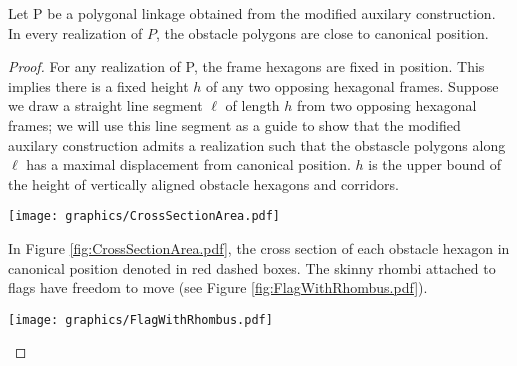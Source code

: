 \begin{lem}\label{lem:aux-C}
Let P be a polygonal linkage obtained from the modified auxilary construction.  
In every realization of $P$, the obstacle polygons are close to canonical position.
\end{lem}

\begin{proof}


For any realization of P, the frame hexagons are fixed in position.  
This implies there is a fixed height $h$ of any two opposing hexagonal frames.
Suppose we draw a straight line segment $\ell$ of length $h$ from two opposing hexagonal frames; we will use this line segment as a guide to show that the modified auxilary construction admits a realization such that the obstascle polygons along $\ell$ has a maximal displacement from canonical position.
$h$ is the upper bound of the height of vertically aligned obstacle hexagons and corridors.

\begin{minipage}{\linewidth}
\begin{center}
\texttt{[image: graphics/CrossSectionArea.pdf]}
\label{fig:CrossSectionArea.pdf}
\end{center}
\end{minipage}

In Figure \ref{fig:CrossSectionArea.pdf}, the cross section of each obstacle hexagon in canonical position denoted in red dashed boxes.
The skinny rhombi attached to flags have freedom to move (see Figure \ref{fig:FlagWithRhombus.pdf}).

\begin{minipage}{\linewidth}
\begin{center}
\texttt{[image: graphics/FlagWithRhombus.pdf]}
\label{fig:FlagWithRhombus.pdf}
\end{center}
\end{minipage}


\end{proof}
